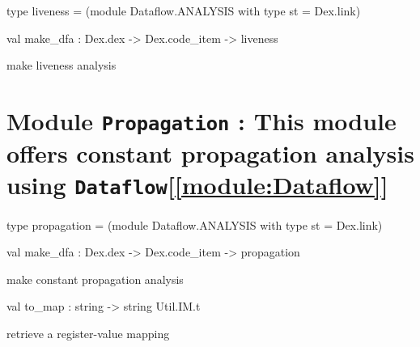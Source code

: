 \documentclass[11pt]{article}
\begin{document}
\ocamldocvspace{0.5cm}



\label{type:Liveness.liveness}\begin{ocamldoccode}
type liveness = (module Dataflow.ANALYSIS with type st = Dex.link) 
\end{ocamldoccode}




\label{val:Liveness.make-underscoredfa}\begin{ocamldoccode}
val make_dfa : Dex.dex -> Dex.code_item -> liveness
\end{ocamldoccode}
\begin{ocamldocdescription}
make liveness analysis


\end{ocamldocdescription}


\section{Module {\tt{Propagation}} : This module offers constant propagation analysis using {\tt{Dataflow}}[\ref{module:Dataflow}]}
\label{module:Propagation}




\ocamldocvspace{0.5cm}



\label{type:Propagation.propagation}\begin{ocamldoccode}
type propagation = (module Dataflow.ANALYSIS with type st = Dex.link) 
\end{ocamldoccode}




\label{val:Propagation.make-underscoredfa}\begin{ocamldoccode}
val make_dfa : Dex.dex -> Dex.code_item -> propagation
\end{ocamldoccode}
\begin{ocamldocdescription}
make constant propagation analysis


\end{ocamldocdescription}




\label{val:Propagation.to-underscoremap}\begin{ocamldoccode}
val to_map : string -> string Util.IM.t
\end{ocamldoccode}
\begin{ocamldocdescription}
retrieve a register-value mapping


\end{ocamldocdescription}
\end{document}
